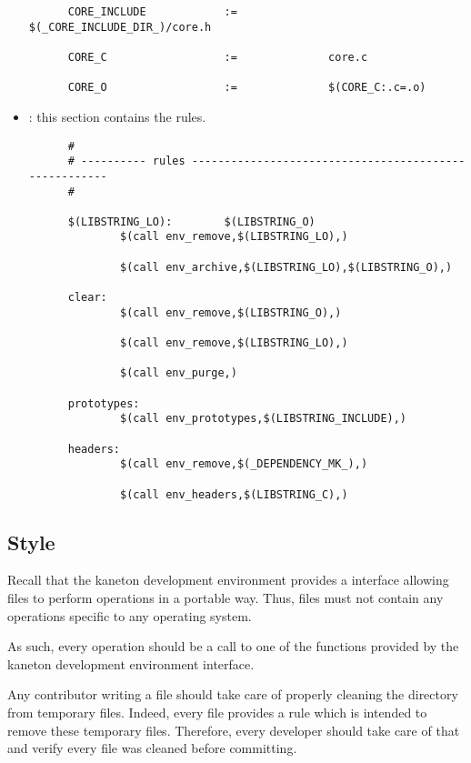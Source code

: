 \begin{itemize}
\begin{verbatim}
      CORE_INCLUDE            :=              $(_CORE_INCLUDE_DIR_)/core.h

      CORE_C                  :=              core.c

      CORE_O                  :=              $(CORE_C:.c=.o)
    \end{verbatim}
  \item
    : this section contains the  rules.

    \begin{verbatim}
      #
      # ---------- rules ------------------------------------------------------
      #

      $(LIBSTRING_LO):        $(LIBSTRING_O)
              $(call env_remove,$(LIBSTRING_LO),)

              $(call env_archive,$(LIBSTRING_LO),$(LIBSTRING_O),)

      clear:
              $(call env_remove,$(LIBSTRING_O),)

              $(call env_remove,$(LIBSTRING_LO),)

              $(call env_purge,)

      prototypes:
              $(call env_prototypes,$(LIBSTRING_INCLUDE),)

      headers:
              $(call env_remove,$(_DEPENDENCY_MK_),)

              $(call env_headers,$(LIBSTRING_C),)
    \end{verbatim}
\end{itemize}


\subsection{Style}

Recall that the kaneton development environment provides a 
interface allowing  files to perform operations in a portable
way. Thus,  files must not contain any operations specific
to any operating system.

As such, every operation should be a call to one of the  functions
provided by the kaneton development environment interface.

Any contributor writing a  file should take care of properly
cleaning the directory from temporary files. Indeed, every  file
provides a  rule which is intended to remove these temporary
files. Therefore, every developer should take care of that and verify every
file was cleaned before committing.

